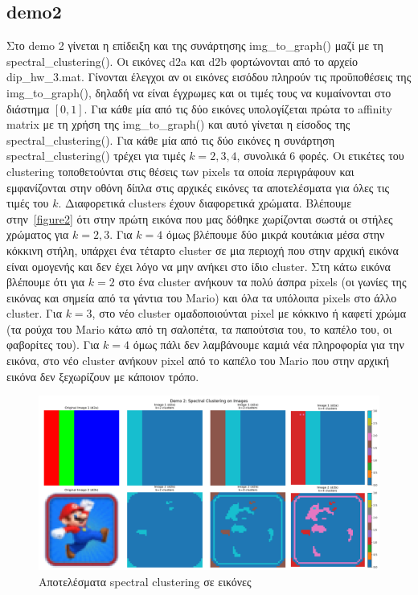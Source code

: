 \documentclass{article}
\begin{document}
\subsection{demo2}
Στο demo 2 γίνεται η επίδειξη και της συνάρτησης img\_to\_graph() μαζί με τη 
spectral\_clustering(). Οι εικόνες d2a και d2b φορτώνονται από το αρχείο 
dip\_hw\_3.mat. Γίνονται έλεγχοι αν οι εικόνες εισόδου πληρούν τις προϋποθέσεις 
της img\_to\_graph(), δηλαδή να είναι έγχρωμες και οι τιμές τους να κυμαίνονται 
στο διάστημα $[0,1]$. Για κάθε μία από τις δύο εικόνες υπολογίζεται πρώτα το
affinity matrix με τη χρήση της img\_to\_graph() και αυτό γίνεται η είσοδος
της spectral\_clustering(). Για κάθε μία από τις δύο εικόνες η συνάρτηση 
spectral\_clustering() τρέχει για τιμές $k = 2,3,4$, συνολικά 6 φορές. Οι
ετικέτες του clustering τοποθετούνται στις θέσεις των pixels τα οποία περιγράφουν
και εμφανίζονται στην οθόνη δίπλα στις αρχικές εικόνες τα αποτελέσματα για όλες 
τις τιμές του $k$. Διαφορετικά clusters έχουν διαφορετικά χρώματα. Βλέπουμε 
στην~\autoref{figure2} ότι στην πρώτη εικόνα που μας δόθηκε χωρίζονται σωστά 
οι στήλες χρώματος για $k=2,3$. Για $k=4$ όμως βλέπουμε δύο μικρά κουτάκια 
μέσα στην κόκκινη στήλη, υπάρχει ένα τέταρτο cluster σε μια περιοχή που
στην αρχική εικόνα είναι ομογενής και δεν έχει λόγο να μην ανήκει στο 
ίδιο cluster. Στη κάτω εικόνα βλέπουμε ότι για $k=2$ στο ένα cluster ανήκουν
τα πολύ άσπρα pixels (οι γωνίες της εικόνας και σημεία από τα γάντια του Mario)
και όλα τα υπόλοιπα pixels στο άλλο cluster. Για $k=3$, στο νέο cluster 
ομαδοποιούνται pixel με κόκκινο ή καφετί χρώμα (τα ρούχα του Mario κάτω από
τη σαλοπέτα, τα παπούτσια του, το καπέλο του, οι φαβορίτες του). Για $k=4$ 
όμως πάλι δεν λαμβάνουμε καμιά νέα πληροφορία για την εικόνα, στο νέο 
cluster ανήκουν pixel από το καπέλο του Mario που στην αρχική εικόνα
δεν ξεχωρίζουν με κάποιον τρόπο.

\begin{figure}
    \centering
    \includegraphics[width=\linewidth]{Figure_2.png}
    \caption{Αποτελέσματα spectral clustering σε εικόνες}\label{figure2}
\end{figure}
\end{document}
